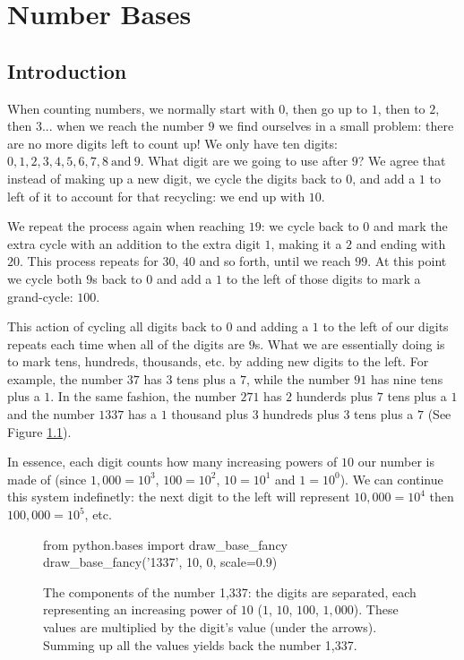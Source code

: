 %

\chapter{Number Bases}
\section{Introduction}
When counting numbers, we normally start with $0$, then go up to $1$, then to $2$, then $3$... when we reach the number $9$ we find ourselves in a small problem: there are no more digits left to count up! We only have ten digits: $0,1,2,3,4,5,6,7,8\ \text{and}\ 9$. What digit are we going to use after $9$? We agree that instead of making up a new digit, we cycle the digits back to $0$, and add a $1$ to left of it to account for that recycling: we end up with $10$. \par

We repeat the process again when reaching $19$: we cycle back to $0$ and mark the extra cycle with an addition to the extra digit $1$, making it a $2$ and ending with $20$. This process repeats for $30$, $40$ and so forth, until we reach $99$. At this point we cycle both $9$s back to $0$ and add a $1$ to the left of those digits to mark a grand-cycle: $100$. \par

This action of cycling all digits back to $0$ and adding a $1$ to the left of our digits repeats each time when all of the digits are $9$s. What we are essentially doing is to mark tens, hundreds, thousands, etc. by adding new digits to the left. For example, the number $37$ has $3$ tens plus a $7$, while the number $91$ has nine tens plus a $1$. In the same fashion, the number $271$ has $2$ hunderds plus $7$ tens plus a $1$ and the number $1337$ has a $1$ thousand plus $3$ hundreds plus $3$ tens plus a $7$ (See Figure \ref{fig:components_of_1337}). \par
In essence, each digit counts how many increasing powers of $10$ our number is made of (since $1,000=10^{3}$, $100=10^{2}$, $10=10^{1}$ and $1=10^{0}$). We can continue this system indefinetly: the next digit to the left will represent $10,000=10^{4}$ then $100,000=10^{5}$, etc. \par

\begin{figure}
  \centering
  \begin{pycode}
from python.bases import draw_base_fancy
draw_base_fancy('1337', 10, 0, scale=0.9)
  \end{pycode}
  \caption[Components of 1,337]{The components of the number 1,337: the digits are separated, each representing an increasing power of $10$ ($1$, $10$, $100$, $1,000$). These values are multiplied by the digit's value (under the arrows). Summing up all the values yields back the number 1,337.}
  \label{fig:components_of_1337}
\end{figure}

